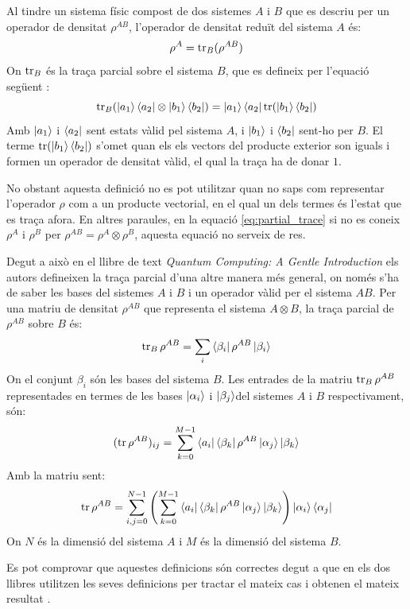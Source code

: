 Al tindre un sistema físic compost de dos sistemes $A$ i $B$ que es descriu per un operador de densitat $\rho^{AB}$, l'operador de densitat reduït del sistema $A$ és:
\begin{equation}
\rho^A = \tr_B(\rho^{AB})
	\label{eq:partial_trace}
\end{equation}
On $\tr_B$ és la traça parcial sobre el sistema $B$, que es defineix per l'equació següent \cite{QCandQI:partial_trace}: 
\begin{equation*}
	\tr_B(\ket{a_1}\bra{a_2}\otimes\ket{b_1}\bra{b_2}) = \ket{a_1}\bra{a_2}\tr(\ket{b_1}\bra{b_2})
\end{equation*}
Amb $\ket{a_1}$ i $\bra{a_2}$ sent estats vàlid pel sistema $A$, i $\ket{b_1}$ i $\bra{b_2}$ sent-ho per $B$. El terme $\tr(\ket{b_1}\bra{b_2})$ s'omet quan els els vectors del producte exterior son iguals i formen un operador de densitat vàlid, el qual la traça ha de donar $1$.

No obstant aquesta definició no es pot utilitzar quan no saps com representar l'operador $\rho$ com a un producte vectorial, en el qual un dels termes és l'estat que es traça afora. En altres paraules, en la equació \ref{eq:partial_trace} si no es coneix $\rho^A$ i $\rho^B$ per $\rho^{AB} = \rho^A\otimes\rho^B$, aquesta equació no serveix de res.  

Degut a això en el llibre de text \textit{Quantum Computing: A Gentle Introduction} \cite{QC_intro} els autors defineixen la traça parcial d'una altre manera més general, on només s'ha de saber les bases del sistemes $A$ i $B$ i un operador vàlid per el sistema $AB$. Per una matriu de densitat $\rho^{AB}$ que representa el sistema $A\otimes B$, la traça parcial de $\rho^{AB}$ sobre $B$ és:
$$
\tr_B \rho^{AB} = \sum_i \bra{\beta_i}\rho^{AB}\ket{\beta_i}
$$
On el conjunt ${\beta_i}$ són les bases del sistema $B$. Les entrades de la matriu $\tr_B \rho^{AB}$ representades en termes de les bases ${\ket{\alpha_i}}$ i ${\ket{\beta_j}} $del sistemes $A$ i $B$ respectivament, són:
$$
(\tr\rho^{AB})_{ij} = \sum_{k=0}^{M-1} \bra{a_i}\bra{\beta_k}\rho^{AB}\ket{\alpha_j}\ket{\beta_k}
$$
Amb la matriu sent:
$$
\tr\rho^{AB} = 
\sum_{i,j=0}^{N-1}\left(\sum_{k=0}^{M-1} \bra{a_i}\bra{\beta_k}\rho^{AB}\ket{\alpha_j}\ket{\beta_k}\right) \ket{\alpha_i}\bra{\alpha_j}
$$
On $N$ és la dimensió del sistema $A$ i $M$ és la dimensió del sistema $B$. 

Es pot comprovar que aquestes definicions són correctes degut a que en els dos llibres utilitzen les seves definicions per tractar el mateix cas i obtenen el mateix resultat \cite{QCandQI:example_partial, QC_intro:example_partial}.

